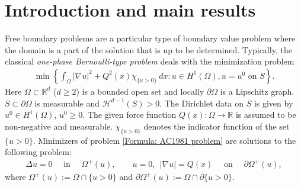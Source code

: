 \documentclass[11pt,reqno]{amsart}
\begin{document}
\section{Introduction and main results}
Free boundary problems are a particular type of boundary value problem where the domain is a part of the solution that is up to be determined. Typically, the classical \emph{one-phase Bernoulli-type problem} deals with the minimization problem
\begin{align}\label{Formula: AC1981 problem}
	\min\left\lbrace\int_{\Omega}|\nabla u|^{2}+Q^{2}(x)\chi_{\{u>0\}}\:dx\colon u\in H^{1}(\Omega),u=u^{0}\text{ on }S\right\rbrace.
\end{align}
Here $\Omega\subset\mathbb{R}^{d}$ ($d\geqslant2$) is a bounded open set and locally $\partial\Omega$ is a Lipschitz graph. $S\subset\partial\Omega$ is measurable and $\mathcal{H}^{d-1}(S)>0$. The Dirichlet data on $S$ is given by $u^{0}\in H^{1}(\Omega)$, $u^{0}\geqslant0$. The given force function $Q(x)\colon\Omega\to\mathbb{R}$ is assumed to be non-negative and measurable. $\chi_{\{u>0\}}$ denotes the indicator function of the set $\{u>0\}$. Minimizers of problem \eqref{Formula: AC1981 problem} are solutions to the following problem:
\begin{align}\label{Formula: Homogeneous one-phase Bernoulli}
	\Delta u=0\quad\text{ in }\quad\varOmega^{+}(u),\qquad u=0,\ \ |\nabla u|=Q(x)\quad\text{ on }\quad\partial\varOmega^{+}(u),
\end{align}
where $\varOmega^{+}(u):=\Omega\cap\{u>0\}$ and $\partial\varOmega^{+}(u):=\Omega\cap\partial\{u>0\}$. 
\end{document}
